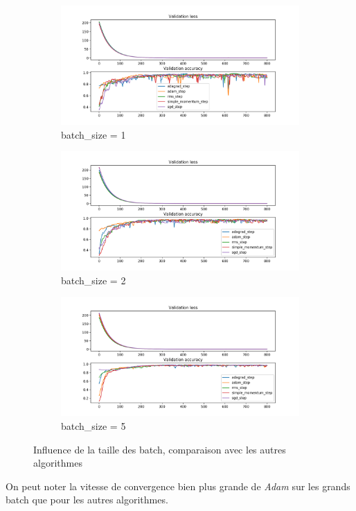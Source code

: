 \documentclass[fleqn,11pt, titlepage, french]{article}
\begin{document}
	\begin{figure}[H]
	\centering
	\begin{subfigure}{0.45\textwidth}
		\centering
		\includegraphics[scale=0.25]{../gdsvm/exports/mnist-batch1-comparison.png}
		\caption{batch\_size = 1}
	\end{subfigure}
	\begin{subfigure}{0.45\textwidth}
		\centering
		\includegraphics[scale=0.25]{../gdsvm/exports/mnist-batch2-comparison.png}
		\caption{batch\_size = 2}
	\end{subfigure}
	\begin{subfigure}{1\textwidth}
		\centering
		\includegraphics[scale=0.4]{../gdsvm/exports/mnist-batch5-comparison.png}
		\caption{batch\_size = 5}
	\end{subfigure}
	
	\caption{Influence de la taille des batch, comparaison avec les autres algorithmes}
\end{figure}

	On peut noter la vitesse de convergence bien plus grande de \emph{Adam} sur les grands batch que pour les autres algorithmes.
	
	


	

	
	

	
	
\end{document}
